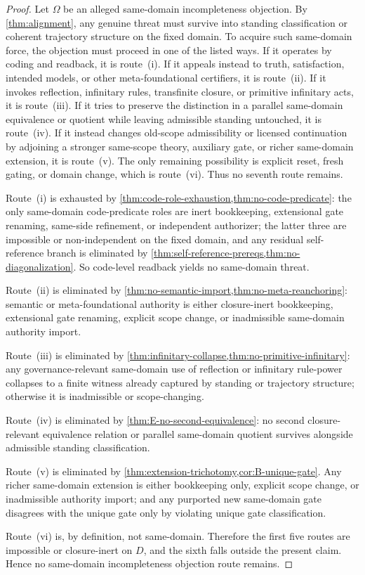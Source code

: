 \documentclass[11pt]{article}
\theoremstyle{plain}
\theoremstyle{definition}
\newcommand{\domain}{D}
\begin{document}
\begin{proof}
Let $\Omega$ be an alleged same-domain incompleteness objection. By \cref{thm:alignment}, any genuine threat must survive into standing classification or coherent trajectory structure on the fixed domain. To acquire such same-domain force, the objection must proceed in one of the listed ways. If it operates by coding and readback, it is route~(i). If it appeals instead to truth, satisfaction, intended models, or other meta-foundational certifiers, it is route~(ii). If it invokes reflection, infinitary rules, transfinite closure, or primitive infinitary acts, it is route~(iii). If it tries to preserve the distinction in a parallel same-domain equivalence or quotient while leaving admissible standing untouched, it is route~(iv). If it instead changes old-scope admissibility or licensed continuation by adjoining a stronger same-scope theory, auxiliary gate, or richer same-domain extension, it is route~(v). The only remaining possibility is explicit reset, fresh gating, or domain change, which is route~(vi). Thus no seventh route remains.

Route~(i) is exhausted by \cref{thm:code-role-exhaustion,thm:no-code-predicate}: the only same-domain code-predicate roles are inert bookkeeping, extensional gate renaming, same-side refinement, or independent authorizer; the latter three are impossible or non-independent on the fixed domain, and any residual self-reference branch is eliminated by \cref{thm:self-reference-prereqs,thm:no-diagonalization}. So code-level readback yields no same-domain threat.

Route~(ii) is eliminated by \cref{thm:no-semantic-import,thm:no-meta-reanchoring}: semantic or meta-foundational authority is either closure-inert bookkeeping, extensional gate renaming, explicit scope change, or inadmissible same-domain authority import.

Route~(iii) is eliminated by \cref{thm:infinitary-collapse,thm:no-primitive-infinitary}: any governance-relevant same-domain use of reflection or infinitary rule-power collapses to a finite witness already captured by standing or trajectory structure; otherwise it is inadmissible or scope-changing.

Route~(iv) is eliminated by \cref{thm:E-no-second-equivalence}: no second closure-relevant equivalence relation or parallel same-domain quotient survives alongside admissible standing classification.

Route~(v) is eliminated by \cref{thm:extension-trichotomy,cor:B-unique-gate}. Any richer same-domain extension is either bookkeeping only, explicit scope change, or inadmissible authority import; and any purported new same-domain gate disagrees with the unique gate only by violating unique gate classification.

Route~(vi) is, by definition, not same-domain. Therefore the first five routes are impossible or closure-inert on $\domain$, and the sixth falls outside the present claim. Hence no same-domain incompleteness objection route remains.
\end{proof}
\end{document}
